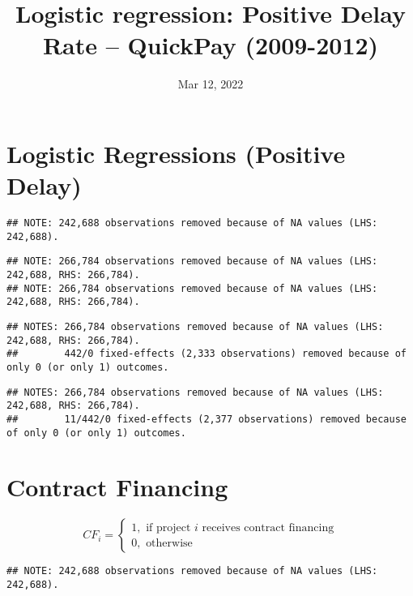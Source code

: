 \documentclass[
]{article}
\title{Logistic regression: Positive Delay Rate -- QuickPay (2009-2012)}
\author{}
\date{\vspace{-2.5em}Mar 12, 2022}
\begin{document}
\maketitle

\hypertarget{logistic-regressions-positive-delay}{%
\section{Logistic Regressions (Positive
Delay)}\label{logistic-regressions-positive-delay}}

\begin{verbatim}
## NOTE: 242,688 observations removed because of NA values (LHS: 242,688).
\end{verbatim}

\begin{verbatim}
## NOTE: 266,784 observations removed because of NA values (LHS: 242,688, RHS: 266,784).
## NOTE: 266,784 observations removed because of NA values (LHS: 242,688, RHS: 266,784).
\end{verbatim}

\begin{verbatim}
## NOTES: 266,784 observations removed because of NA values (LHS: 242,688, RHS: 266,784).
##        442/0 fixed-effects (2,333 observations) removed because of only 0 (or only 1) outcomes.
\end{verbatim}

\begin{verbatim}
## NOTES: 266,784 observations removed because of NA values (LHS: 242,688, RHS: 266,784).
##        11/442/0 fixed-effects (2,377 observations) removed because of only 0 (or only 1) outcomes.
\end{verbatim}

\hypertarget{contract-financing}{%
\section{Contract Financing}\label{contract-financing}}

\[ CF_i = \begin{cases} 1, \text{ if project } i \text{ receives contract financing}\\
0, \text{ otherwise} \end{cases}\]

\begin{verbatim}
## NOTE: 242,688 observations removed because of NA values (LHS: 242,688).
\end{verbatim}
\end{document}
